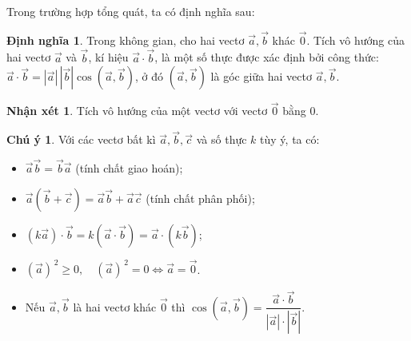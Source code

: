 \documentclass[12pt,a4paper,oneside]{book}
\theoremstyle{theorem}
\theoremstyle{definition}
\newtheorem{dn}[theorem2]{Định nghĩa}
\newtheorem{nx}[theorem2]{Nhận xét}
\newtheorem{cy}[theorem2]{Chú ý}
\begin{document}
\begin{itemize}
        Trong trường hợp tổng quát, ta có định nghĩa sau:
        \begin{dn}
            Trong không gian, cho hai vectơ $\vec{a},\vec{b}$ khác $\vec{0}$. Tích vô hướng của hai vectơ $\vec{a}$ và $\vec{b}$, kí hiệu
            $\vec{a}\cdot\vec{b}$, là một số thực được xác định bởi công thức:
            $\vec{a}\cdot\vec{b}=|\vec{a}|\,|\vec{b}|\cos(\vec{a},\vec{b})$, ở đó $(\vec{a},\vec{b})$ là góc giữa hai vectơ $\vec{a},\vec{b}$.
        \end{dn}
        \begin{nx}
            Tích vô hướng của một vectơ với vectơ $\vec{0}$ bằng $0$.
        \end{nx}
        \begin{cy}
            Với các vectơ bất kì $\vec{a}, \vec{b}, \vec{c}$ và số thực $k$ tùy ý, ta có:
            \begin{itemize}
                \item $\vec{a}\vec{b} = \vec{b}\vec{a}$ (tính chất giao hoán);
                \item $\vec{a}(\vec{b}+\vec{c}) = \vec{a}\vec{b}+\vec{a}\vec{c}$ (tính chất phân phối);
                \item $(k\vec{a})\cdot\vec{b} = k(\vec{a}\cdot\vec{b}) = \vec{a}\cdot(k\vec{b})$;
                \item $(\vec{a})^{\,2} \geq 0,\quad (\vec{a})^{\,2}=0 \Leftrightarrow \vec{a}=\vec{0}$.
                \item Nếu $\vec{a},\vec{b}$ là hai vectơ khác $\vec{0}$ thì $\cos(\vec{a},\vec{b})=\dfrac{\vec{a}\cdot\vec{b}}{|\vec{a}|\cdot|\vec{b}|}$.
            \end{itemize}
        \end{cy}
        \end{itemize}
\end{document}
